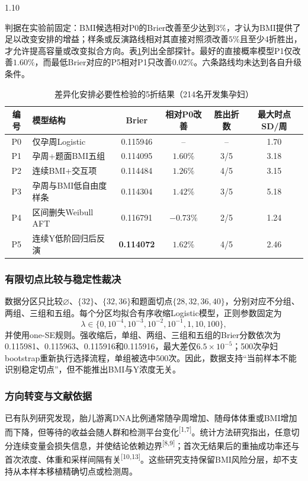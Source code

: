 \documentclass[12pt,a4paper]{ctexrep}
\numberwithin{equation}{section}
\newcommand{\citeup}[1]{\textsuperscript{[#1]}}
\begin{document}
\begin{spacing}{1.10}
{			判据在实验前固定：BMI候选相对P0的Brier改善至少达到$3\%$，才认为BMI提供了足以改变安排的增益；样条或反演路线相对其直接对照须改善$5\%$且至少4折胜出，才允许提高容量或改变拟合方向。表\ref{tab:q2_pilot}列出全部探针。最好的直接概率模型P1仅改善$1.60\%$，而最低Brier对应的P5相对P1只改善$0.02\%$。六条路线均未达到各自升级条件。

			\begin{table}[H]
			\centering
			\footnotesize
			\caption{差异化安排必要性检验的5折结果（214名开发集孕妇）}
			\label{tab:q2_pilot}
			\begin{tabularx}{\textwidth}{@{}cXcccc@{}}
			\toprule
			编号 & 模型结构 & Brier & 相对P0改善 & 胜出折数 & 最大时点SD/周 \\
			\midrule
			P0 & 仅孕周Logistic & 0.115946 & -- & -- & 1.70 \\
			P1 & 孕周+题面BMI五组 & 0.114095 & $1.60\%$ & 3/5 & 3.18 \\
			P2 & 连续BMI+交互项 & 0.114484 & $1.26\%$ & 4/5 & 3.15 \\
			P3 & 孕周与BMI低自由度样条 & 0.114304 & $1.42\%$ & 3/5 & 5.18 \\
			P4 & 区间删失Weibull AFT & 0.116791 & $-0.73\%$ & 2/5 & 1.24 \\
			P5 & 连续Y低阶回归后反演 & \textbf{0.114072} & $1.62\%$ & 4/5 & 2.46 \\
			\bottomrule
			\end{tabularx}
			\end{table}

			\subsubsection{有限切点比较与稳定性裁决}
			数据分区只比较$\varnothing$、$\{32\}$、$\{32,36\}$和题面切点$\{28,32,36,40\}$，分别对应不分组、两组、三组和五组。每个分区均拟合有序收缩Logistic模型，正则参数固定为
			\[
			\lambda\in\{0,10^{-4},10^{-3},10^{-2},10^{-1},1,10,100\},
			\]
			并使用one-SE规则。强收缩后，单组、两组、三组和五组的Brier分数依次为0.115981、0.115963、0.115916和0.115916，最大差仅$6.5\times10^{-5}$；500次孕妇bootstrap重新执行选择流程，单组被选中500次。因此，数据支持“当前样本不能识别稳定切点”，但不能推出BMI与Y浓度无关。

			\subsubsection{方向转变与文献依据}
			已有队列研究发现，胎儿游离DNA比例通常随孕周增加、随母体体重或BMI增加而下降，但等待的收益会随人群和检测平台变化\citeup{1,7}。统计方法研究指出，任意切分连续变量会损失信息，并使结论依赖边界\citeup{8,9}；首次无结果后的重抽成功率还与首次浓度、体重和采样间隔有关\citeup{10,13}。这些研究支持保留BMI风险分层，却不支持从本样本移植精确切点或检测周。

}
\end{spacing}
\end{document}
